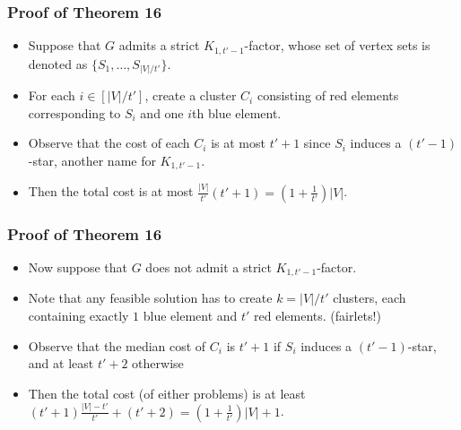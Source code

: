 \documentclass{beamer}
\begin{document}


\begin{frame}
\frametitle{Proof of Theorem 16}

\begin{itemize}
	\item Suppose that $G$ admits a strict $K_{1, t' - 1}$-factor, whose set of vertex sets is denoted as $\{S_1, \dots, S_{|V|/t'}\}$.
	
	\item For each $i \in [|V|/t']$, create a cluster $C_i$ consisting of red elements corresponding to $S_i$ and one $i$th blue element.
	
	\item Observe that the cost of each $C_i$ is at most $t' + 1$ since $S_i$ induces a $(t' - 1)$-star, another name for $K_{1, t' - 1}$.
	
	\item Then the total cost is at most $\frac{|V|}{t'} (t' + 1) = \left( 1 + \frac{1}{t'} \right) |V|$.
	
\end{itemize}


\end{frame}



\begin{frame}
\frametitle{Proof of Theorem 16}

\begin{itemize}
	\item Now suppose that $G$ does not admit a strict $K_{1, t' - 1}$-factor.
	
	\item Note that any feasible solution has to create $k = |V|/t'$ clusters, each containing exactly $1$ blue element and $t'$ red elements. (fairlets!)
	
	\item Observe that the median cost of $C_i$ is $t' + 1$ if $S_i$ induces a $(t' - 1)$-star, and at least $t' + 2$ otherwise
	
	\item Then the total cost (of either problems) is at least
	$(t' + 1) \frac{|V| - t'}{t'} + (t' + 2) = \left( 1 + \frac{1}{t'} \right) |V| + 1$.
	
\end{itemize}

\end{frame}
\end{document}
